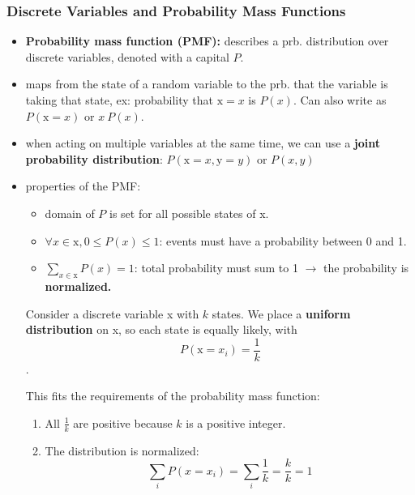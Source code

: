 \subsubsection{Discrete Variables and Probability Mass Functions}
\begin{itemize}
    \item \textbf{Probability mass function (PMF):} describes a prb. distribution over discrete variables, denoted with a capital $P$.
    \item maps from the state of a random variable to the prb. that the variable is taking that state, ex: probability that $\text{x} = x$ is $P(x)$.
    Can also write as $P(\text{x} = x)$ or $x ~ P(x)$.
    \item when acting on multiple variables at the same time, we can use a \textbf{joint probability distribution}: $P(\text{x} = x, \text{y} = y)$ or $P(x, y)$
    \item properties of the PMF:
    \begin{itemize}
        \item domain of $P$ is set for all possible states of x.
        \item $\forall x \in \text{x}, 0 \leq P(x) \leq 1$: events must have a probability between 0 and 1.
        \item $\sum_{x \in \text{x}} P(x) = 1$: total probability must sum to 1 $\rightarrow$ the probability is \textbf{normalized.}
    \end{itemize}
    \begin{example}
        Consider a discrete variable x with $k$ states. We place a \textbf{uniform distribution} on x, so each state is equally likely, with
        $$ P(\text{x} = x_i) = \frac{1}{k} $$.

        This fits the requirements of the probability mass function:
        \begin{enumerate}
            \item All $\frac{1}{k}$ are positive because $k$ is a positive integer.
            \item The distribution is normalized: 
            $$ \sum_{i} P(x = x_i) = \sum_{i} \frac{1}{k} = \frac{k}{k} = 1 $$
        \end{enumerate}
    \end{example}
\end{itemize}


